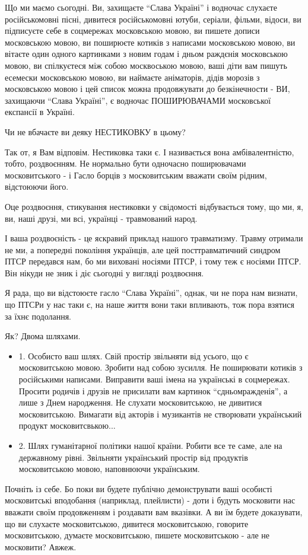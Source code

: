 Що ми маємо сьогодні. Ви, захищаєте \enquote{Слава Україні} і водночас слухаєте
російськомовні пісні, дивитеся російськомовні ютуби, серіали, фільми, відоси,
ви підписуєте себе в соцмережах московською мовою, ви пишете дописи московською
мовою, ви поширюєте котиків з написами московською мовою, ви вітаєте один
одного картинками з новим годам і дньом раждєнія московською мовою, ви
спілкуєтеся між собою москвоською мовою, ваші діти вам пишуть есемески
московською мовою, ви наймаєте аніматорів, дідів морозів з московською мовою і
цей список можна продовжувати до безкінечности - ВИ, захищаючи \enquote{Слава Україні},
є водночас  ПОШИРЮВАЧАМИ московської експансії в Україні.

Чи не вбачаєте ви деяку НЕСТИКОВКУ в цьому? 

Так от, я Вам відповім. Нестиковка таки є. І називається вона амбівалентністю,
тобто, роздвоєнням. Не нормально бути одночасно поширювачами московитського  -
і Гасло борців з московитським вважати своїм рідним, відстоюючи його. 

Оце роздвоєння, стикування нестиковки у свідомості відбувається тому, що ми, я,
ви, наші друзі, ми всі, українці - травмований народ.

І ваша роздвоєність - це яскравий приклад нашого травматизму. Травму отримали
не ми, а попередні покоління українців, але цей посттравматичний синдром ПТСР
передався нам, бо ми виховані носіями ПТСР, і тому теж є носіями ПТСР. Він
нікуди не зник і діє сьогодні у вигляді роздвоєння. 

Я рада, що ви відстоюєте гасло \enquote{Слава Україні}, однак, чи не пора нам визнати,
що ПТСРи у нас таки є, на наше життя вони таки впливають, тож пора взятися за
їхнє подолання.

Як? Двома шляхами. 

\begin{itemize}
\item 1. Особисто ваш шлях. Свій простір звільняти від усього, що є московитською
мовою. Зробити над собою зусилля. Не поширювати котиків з російськими написами.
Виправити ваші імена на українські в соцмережах. Просити родичів і друзів не
присилати вам картинок \enquote{сдньомражденія}, а лише з Днем народження. Не слухати
московитською, не дивитися московитською. Вимагати від акторів і музикантів не
створювати український продукт московитсвькою...

\item 2. Шлях гуманітарної політики нашої країни. Робити все те саме, але на
державному рівні. Звільняти український простір від продуктів московитською
мовою, наповнюючи українським.
\end{itemize}

Почніть із себе. Бо поки ви будете публічно демонструвати ваші особисті
московитські вподобання (наприклад, плейлисти) - доти і будуть московити нас
вважати своїм продовженням і роздавати вам вказівки. А ви їм будете доказувати,
що ви слухаєте московитською, дивитеся московитською, говорите московитською,
думаєте московитською, пишете московитською - але не московити? Авжеж.
